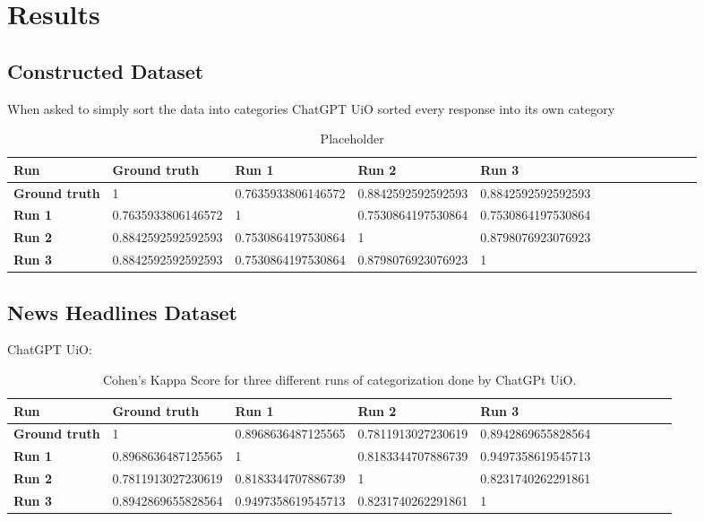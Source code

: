 \section{Results}
\subsection{Constructed Dataset}
When asked to simply sort the data into categories ChatGPT UiO sorted every response into its own category
\begin{table}[ht]
    \centering
        \begin{tabular}{@{}lllllllllllll@{}}\toprule        %
            \textbf{Run}  & \textbf{Ground truth} & \textbf{Run 1} & \textbf{Run 2} & \textbf{Run 3}\\ 
            \midrule
            \textbf{Ground truth} & 1  & 0.7635933806146572 & 0.8842592592592593 & 0.8842592592592593\\
            \hdashline
            \textbf{Run 1} & 0.7635933806146572 & 1 & 0.7530864197530864 & 0.7530864197530864\\
            \hdashline
            \textbf{Run 2} & 0.8842592592592593 & 0.7530864197530864 & 1 & 0.8798076923076923\\
            \hdashline
            \textbf{Run 3} & 0.8842592592592593 & 0.7530864197530864 & 0.8798076923076923 & 1\\
            \bottomrule
        \end{tabular}
    \caption{Placeholder}
\end{table}

\subsection{News Headlines Dataset}
ChatGPT UiO:
\begin{table}[h]            %
    \centering
    \begin{tabular}{@{}lllllllllll@{}}\toprule
        \textbf{Run}  & \textbf{Ground truth} & \textbf{Run 1} & \textbf{Run 2} & \textbf{Run 3}\\ 
        \midrule
        \textbf{Ground truth} & \cellcolor[HTML]{FFFFFF} 1  & 0.8968636487125565 & 0.7811913027230619 & 0.8942869655828564\\
        \hdashline
        \textbf{Run 1} & 0.8968636487125565 & 1 & 0.8183344707886739 & 0.9497358619545713\\
        \hdashline
        \textbf{Run 2} & 0.7811913027230619 & 0.8183344707886739 & 1 & 0.8231740262291861\\
        \hdashline
        \textbf{Run 3} & 0.8942869655828564 & 0.9497358619545713 & 0.8231740262291861 & 1\\
        \bottomrule
    \end{tabular}
    \caption{Cohen's Kappa Score for three different runs of categorization done by ChatGPt UiO.}
\end{table}

